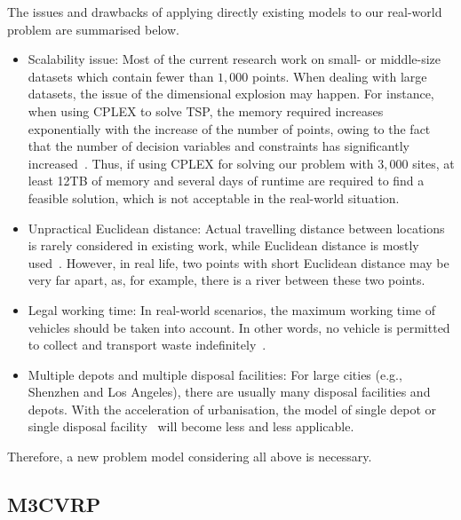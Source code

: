 \documentclass[journal]{IEEEtran}
\begin{document}
The issues and drawbacks of applying directly existing models to our real-world problem are summarised below.
\begin{itemize}
\item Scalability issue: Most of the current research work on small- or middle-size datasets which contain fewer than $1,000$ points. When dealing with large datasets, the issue of the dimensional explosion may happen. For instance, when using CPLEX to solve TSP, the memory required increases exponentially with the increase of the number of points, owing to the fact that the number of decision variables and constraints has significantly increased~\cite{crevier2007multi, babaee2019developing}. Thus, if using CPLEX for solving our problem with $3,000$ sites, at least 12TB of memory and several days of runtime are required to find a feasible solution, which is not acceptable in the real-world situation.
\item Unpractical Euclidean distance: Actual travelling distance between locations is rarely considered in existing work, while Euclidean distance is mostly used~\cite{kim2006waste,Han2015WASTE,rabbani2016hybrid}. However, in real life, two points with short Euclidean distance may be very far apart, as, for example, there is a river between these two points.
\item Legal working time: In real-world scenarios, the maximum working time of vehicles should be taken into account. In other words, no vehicle is permitted to collect and transport waste indefinitely~\cite{tirkolaee2018robust}.
\item Multiple depots and multiple disposal facilities: For large cities (e.g., Shenzhen and Los Angeles), there are usually many disposal facilities and depots. With the acceleration of urbanisation, the model of single depot or single disposal facility~\cite{babaee2019developing,wu2020optimization} will become less and less applicable.
\end{itemize}
Therefore, a new problem model considering all above is necessary.

\subsection{M3CVRP}\label{sec:m3cvrp}
\end{document}
